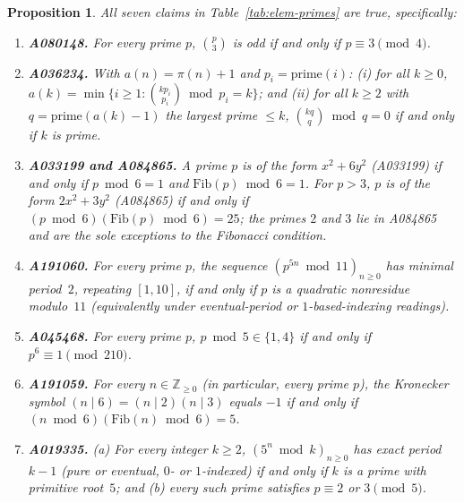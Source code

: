 \documentclass[11pt]{article}
\newtheorem{proposition}[theorem]{Proposition}
\begin{document}
\begin{proposition}\label{prop:elem-primes}
All seven claims in Table~\ref{tab:elem-primes} are true, specifically:
\begin{enumerate}
  \item \textbf{A080148.} For every prime $p$, $\binom{p}{3}$ is odd if and only if $p \equiv 3 \pmod{4}$.
  \item \textbf{A036234.} With $a(n) = \pi(n) + 1$ and $p_i = \mathrm{prime}(i)$: (i) for all $k \ge 0$, $a(k) = \min\{i \ge 1 : \binom{k p_i}{p_i} \bmod p_i = k\}$; and (ii) for all $k \ge 2$ with $q = \mathrm{prime}(a(k)-1)$ the largest prime $\le k$, $\binom{kq}{q} \bmod q = 0$ if and only if $k$ is prime.
  \item \textbf{A033199 and A084865.} A prime $p$ is of the form $x^2 + 6y^2$ (A033199) if and only if $p \bmod 6 = 1$ and $\mathrm{Fib}(p) \bmod 6 = 1$. For $p > 3$, $p$ is of the form $2x^2 + 3y^2$ (A084865) if and only if $(p \bmod 6)(\mathrm{Fib}(p) \bmod 6) = 25$; the primes $2$ and $3$ lie in A084865 and are the sole exceptions to the Fibonacci condition.
  \item \textbf{A191060.} For every prime $p$, the sequence $(p^{5n} \bmod 11)_{n \ge 0}$ has minimal period~$2$, repeating $[1,10]$, if and only if $p$ is a quadratic nonresidue modulo~$11$ (equivalently under eventual-period or $1$-based-indexing readings).
  \item \textbf{A045468.} For every prime $p$, $p \bmod 5 \in \{1,4\}$ if and only if $p^6 \equiv 1 \pmod{210}$.
  \item \textbf{A191059.} For every $n \in \mathbb{Z}_{\ge 0}$ (in particular, every prime $p$), the Kronecker symbol $(n \mid 6) = (n \mid 2)(n \mid 3)$ equals $-1$ if and only if $(n \bmod 6)(\mathrm{Fib}(n) \bmod 6) = 5$.
  \item \textbf{A019335.} (a) For every integer $k \ge 2$, $(5^n \bmod k)_{n \ge 0}$ has exact period $k-1$ (pure or eventual, $0$- or $1$-indexed) if and only if $k$ is a prime with primitive root~$5$; and (b) every such prime satisfies $p \equiv 2$ or $3 \pmod{5}$.
\end{enumerate}
\end{proposition}
\end{document}
